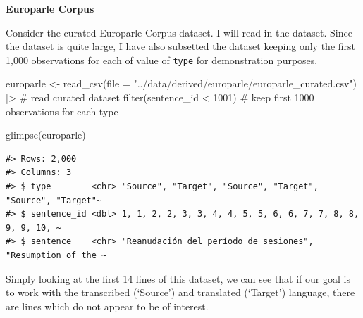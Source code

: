 \documentclass[
  letterpaper,
]{latex/krantz}
\newenvironment{Shaded}{\begin{snugshade}}{\end{snugshade}}
\newcommand{\AttributeTok}[1]{\textcolor[rgb]{0.40,0.45,0.13}{#1}}
\newcommand{\CommentTok}[1]{\textcolor[rgb]{0.37,0.37,0.37}{#1}}
\newcommand{\DecValTok}[1]{\textcolor[rgb]{0.68,0.00,0.00}{#1}}
\newcommand{\FunctionTok}[1]{\textcolor[rgb]{0.28,0.35,0.67}{#1}}
\newcommand{\NormalTok}[1]{\textcolor[rgb]{0.00,0.23,0.31}{#1}}
\newcommand{\OtherTok}[1]{\textcolor[rgb]{0.00,0.23,0.31}{#1}}
\newcommand{\SpecialCharTok}[1]{\textcolor[rgb]{0.37,0.37,0.37}{#1}}
\newcommand{\StringTok}[1]{\textcolor[rgb]{0.13,0.47,0.30}{#1}}
\begin{document}
\textbf{Europarle Corpus}

Consider the curated Europarle Corpus dataset. I will read in the
dataset. Since the dataset is quite large, I have also subsetted the
dataset keeping only the first 1,000 observations for each of value of
\texttt{type} for demonstration purposes.

\begin{Shaded}
\begin{Highlighting}[]
\NormalTok{europarle }\OtherTok{\textless{}{-}} \FunctionTok{read\_csv}\NormalTok{(}\AttributeTok{file =} \StringTok{"../data/derived/europarle/europarle\_curated.csv"}\NormalTok{) }\SpecialCharTok{|\textgreater{}}  \CommentTok{\# read curated dataset}
  \FunctionTok{filter}\NormalTok{(sentence\_id }\SpecialCharTok{\textless{}} \DecValTok{1001}\NormalTok{) }\CommentTok{\# keep first 1000 observations for each type}

\FunctionTok{glimpse}\NormalTok{(europarle)}
\end{Highlighting}
\end{Shaded}

\begin{verbatim}
#> Rows: 2,000
#> Columns: 3
#> $ type        <chr> "Source", "Target", "Source", "Target", "Source", "Target"~
#> $ sentence_id <dbl> 1, 1, 2, 2, 3, 3, 4, 4, 5, 5, 6, 6, 7, 7, 8, 8, 9, 9, 10, ~
#> $ sentence    <chr> "Reanudación del período de sesiones", "Resumption of the ~
\end{verbatim}

Simply looking at the first 14 lines of this dataset, we can see that if
our goal is to work with the transcribed (`Source') and translated
(`Target') language, there are lines which do not appear to be of
interest.
\end{document}
